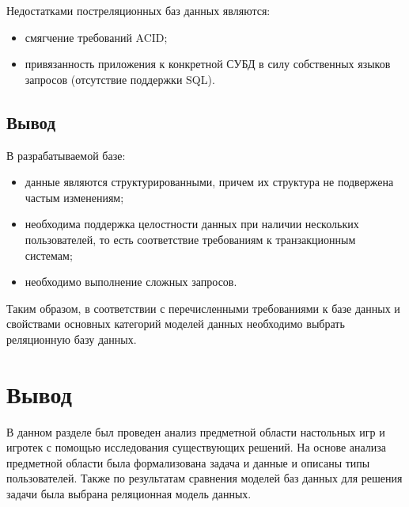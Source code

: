Недостатками постреляционных баз данных являются:
\begin{itemize}
    \item смягчение требований ACID;
    \item привязанность приложения к конкретной СУБД в силу собственных
        языков запросов (отсутствие поддержки SQL).
\end{itemize}

\subsection*{Вывод}

В разрабатываемой базе:

\begin{itemize}
    \item данные являются структурированными, причем их структура не подвержена
        частым изменениям;
    \item необходима поддержка целостности данных при наличии нескольких
        пользователей, то есть соответствие требованиям к транзакционным
        системам;
    \item необходимо выполнение сложных запросов.
\end{itemize}

Таким образом, в соответствии с перечисленными требованиями к базе данных и
свойствами основных категорий моделей данных необходимо выбрать реляционную
базу данных.

\section*{Вывод}

В данном разделе был проведен анализ предметной области настольных игр и игротек
с помощью исследования существующих решений. На основе анализа предметной
области была формализована задача и данные и описаны типы пользователей. Также
по результатам сравнения моделей баз данных для решения задачи была выбрана
реляционная модель данных.

